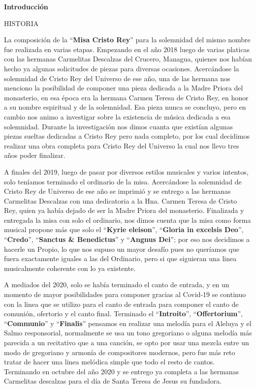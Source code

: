 \documentclass[12pt, letterpaper]{report}
\begin{document}
    \begin{center}
        \vspace*{9cm}
        \textbf{\Huge Introducci\'on}
    \end{center}
    \clearpage

    {\large HISTORIA}

     La composici\'on de la ``\textbf{Misa Cristo Rey}'' para la solemnidad del mismo nombre fue realizada en varias etapas. Empezando en el a\~no 2018 luego de varias platicas con las hermanas Carmelitas Descalzas del Crucero, Managua, quienes nos hab\'ian hecho ya algunas solicitudes de piezas para diversas ocasiones. Acerc\'andose la solemnidad de Cristo Rey del Universo de ese a\~no, una de las hermana nos menciono la posibilidad de componer una pieza dedicada a la Madre Priora del monasterio, en esa \'epoca era la hermana Carmen Teresa de Cristo Rey, en honor a su nombre espiritual y de la solemnidad. Esa pieza nunca se concluyo, pero en cambio nos animo a investigar sobre la existencia de m\'usica dedicada a esa solemnidad. Durante la investigaci\'on nos dimos cuanta que exist\'ian algunas piezas sueltas dedicadas a Cristo Rey pero nada completo, por los cual decidimos realizar una obra completa para Cristo Rey del Universo la cual nos llevo tres a\~nos poder finalizar.

    A finales del 2019, luego de pasar por diversos estilos musicales y varios intentos, solo ten\'iamos terminado el ordinario de la misa. Acerc\'andose la solemnidad de Cristo Rey de Universo de ese a\~no se imprimi\'o y se entrego a las hermanas Carmelitas Descalzas con una dedicatoria a la Hna. Carmen Teresa de Cristo Rey, quien ya hab\'ia dejado de ser la Madre Priora del monasterio. Finalizada y entregada la misa con solo el ordinario, nos dimos cuenta que la misa como forma musical propone m\'as que solo el ``\textbf{Kyrie eleison}'', ``\textbf{Gloria in excelsis Deo}'', ``\textbf{Credo}'', ``\textbf{Sanctus \& Benedictus}'' y ``\textbf{Angnus Dei}''; por eso nos decidimos a hacerle un Propio, lo que nos supuso un mayor desaf\'io pues no quer\'iamos que fuera exactamente iguales a las del Ordinario, pero si que siguieran una linea musicalmente coherente con lo ya existente.

    A mediados del 2020, solo se hab\'ia terminado el canto de entrada, y en un momento de mayor posibilidades para componer gracias al Covid-19 se continuo con la linea que se utilizo para el canto de entrada para componer el canto de comuni\'on, ofertorio y el canto final.  Terminado el ``\textbf{Introito}'', ``\textbf{Offertorium}'', ``\textbf{Communio}'' y ``\textbf{Finalis}'' pensamos en realizar una melod\'ia para el Aleluya y el Salmo responsorial, normalmente se usa un tono gregoriano o alguna melod\'ia m\'as parecida a un recitativo que a una canci\'on, se opto por usar una mezcla entre un modo de gregoriano y armon\'ia de compositores modernos, pero fue m\'as reto tratar de hacer una linea mel\'odica simple que todo el resto de cantos. Terminando en octubre del a\~no 2020 y se entrego ya completa a las hermanas Carmelitas descalzas para el d\'ia de Santa Teresa de Jesus su fundadora.
\end{document}
